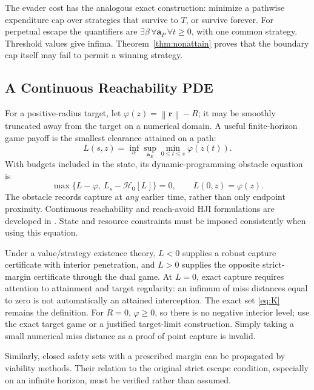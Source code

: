 \documentclass[journal,a4paper]{IEEEtran}
\newcommand{\HH}{\mathcal H}
\newcommand{\norm}[1]{\left\|#1\right\|}
\begin{document}
The evader cost has the analogous exact construction: minimize a pathwise expenditure cap over strategies that survive to $T$, or survive forever. For perpetual escape the quantifiers are $\exists\beta\,\forall\mathbf a_P\,\forall t\ge0$, with one common strategy. Threshold values give infima. Theorem~\ref{thm:nonattain} proves that the boundary cap itself may fail to permit a winning strategy.

\subsection{A Continuous Reachability PDE}
For a positive-radius target, let $\varphi(z)=\norm{\mathbf r}-R$; it may be smoothly truncated away from the target on a numerical domain. A useful finite-horizon game payoff is the smallest clearance attained on a path:
\begin{equation}
 L(s,z)=\inf_\alpha\sup_{\mathbf a_E}
             \min_{0\le t\le s}\varphi(z(t)).
 \label{eq:Lreach}
\end{equation}
With budgets included in the state, its dynamic-programming obstacle equation is
\begin{equation}
 \boxed{\max\{L-\varphi,\ L_s-\HH_0[L]\}=0,\qquad
 L(0,z)=\varphi(z).}
 \label{eq:reachVI}
\end{equation}
The obstacle records capture at \emph{any} earlier time, rather than only endpoint proximity. Continuous reachability and reach-avoid HJI formulations are developed in \cite{Mitchell2005,Margellos2009}. State and resource constraints must be imposed consistently when using this equation.

Under a value/strategy existence theory, $L<0$ supplies a robust capture certificate with interior penetration, and $L>0$ supplies the opposite strict-margin certificate through the dual game. At $L=0$, exact capture requires attention to attainment and target regularity: an infimum of miss distances equal to zero is not automatically an attained interception. The exact set \eqref{eq:K} remains the definition. For $R=0$, $\varphi\ge0$, so there is no negative interior level; use the exact target game or a justified target-limit construction. Simply taking a small numerical miss distance as a proof of point capture is invalid.

Similarly, closed safety sets with a prescribed margin can be propagated by viability methods. Their relation to the original strict escape condition, especially on an infinite horizon, must be verified rather than assumed.
\end{document}
